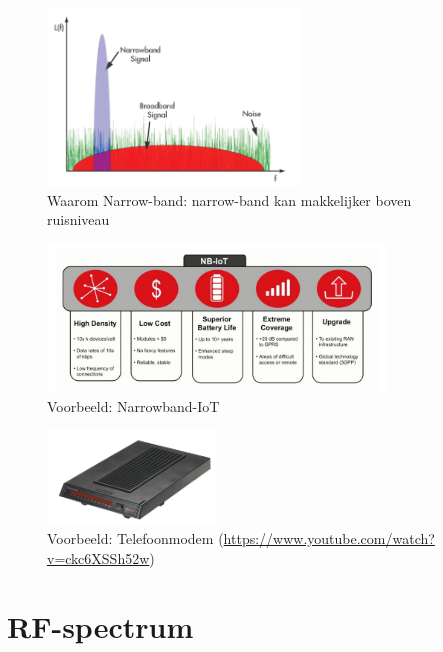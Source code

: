 \documentclass{article}
\begin{document}
\begin{figure}[H]
    \centering
    \includegraphics[width=0.6\textwidth]{Screenshot_20200302_123310.png}
    \caption{Waarom Narrow-band: narrow-band kan makkelijker boven ruisniveau}
\end{figure}

\begin{figure}[H]
    \centering
    \includegraphics[width=0.8\textwidth]{Screenshot_20200302_122906.png}
    \caption{Voorbeeld: Narrowband-IoT}
\end{figure}

\begin{figure}[H]
    \centering
    \includegraphics[width=0.4\textwidth]{Screenshot_20200302_122954.png}
    \caption{Voorbeeld: Telefoonmodem (\url{https://www.youtube.com/watch?v=ckc6XSSh52w})}
\end{figure}

\section{RF-spectrum}
\end{document}
